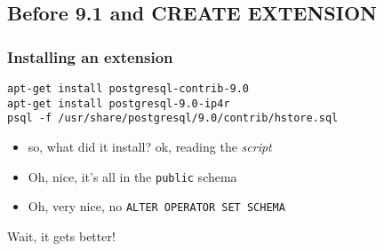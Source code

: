\documentclass[english]{beamer}
\begin{document}
\subsection{Before 9.1 and CREATE EXTENSION}


\begin{frame}[fragile]
  \frametitle{Installing an extension}

  \begin{example}
\begin{verbatim}
apt-get install postgresql-contrib-9.0
apt-get install postgresql-9.0-ip4r
psql -f /usr/share/postgresql/9.0/contrib/hstore.sql
\end{verbatim}
  \end{example}

  \begin{itemize}
    \item<2-> so, what did it install? ok, reading the \textit{script}
    \item<3-> Oh, nice, it's all in the \texttt{public} schema
    \item<4-> Oh, very nice, no \texttt{ALTER OPERATOR SET SCHEMA}
  \end{itemize}

  \begin{center}
    Wait, it gets better!
  \end{center}
\end{frame}

\end{document}
